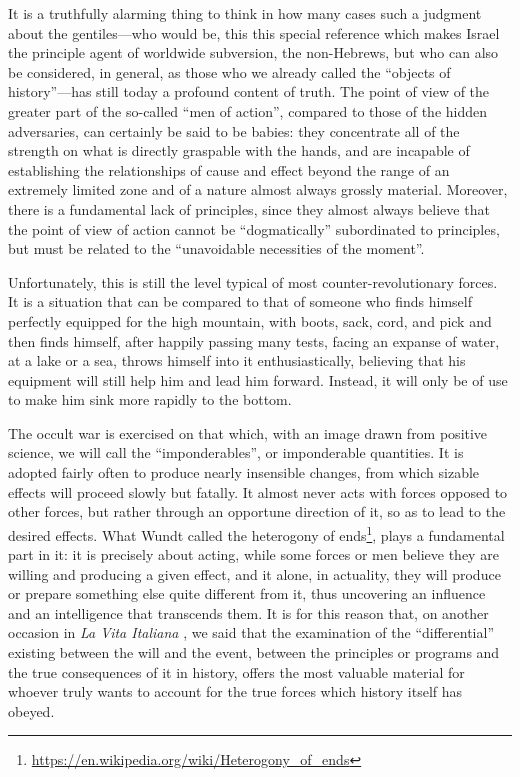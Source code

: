 It is a truthfully alarming thing to think in how many cases such a judgment about the gentiles---who would be, this this special reference which makes Israel the principle agent of worldwide subversion, the non-Hebrews, but who can also be considered, in general, as those who we already called the ``objects of history''---has still today a profound content of truth. The point of view of the greater part of the so-called ``men of action'', compared to those of the hidden adversaries, can certainly be said to be babies: they concentrate all of the strength on what is directly graspable with the hands, and are incapable of establishing the relationships of cause and effect beyond the range of an extremely limited zone and of a nature almost always grossly material. Moreover, there is a fundamental lack of principles, since they almost always believe that the point of view of action cannot be ``dogmatically'' subordinated to principles, but must be related to the ``unavoidable necessities of the moment''.

Unfortunately, this is still the level typical of most counter-revolutionary forces. It is a situation that can be compared to that of someone who finds himself perfectly equipped for the high mountain, with boots, sack, cord, and pick and then finds himself, after happily passing many tests, facing an expanse of water, at a lake or a sea, throws himself into it enthusiastically, believing that his equipment will still help him and lead him forward. Instead, it will only be of use to make him sink more rapidly to the bottom.

The occult war is exercised on that which, with an image drawn from positive science, we will call the ``imponderables'', or imponderable quantities. It is adopted fairly often to produce nearly insensible changes, from which sizable effects will proceed slowly but fatally. It almost never acts with forces opposed to other forces, but rather through an opportune direction of it, so as to lead to the desired effects. What Wundt called the heterogony of ends\footnote{\url{https://en.wikipedia.org/wiki/Heterogony_of_ends}}, plays a fundamental part in it: it is precisely about acting, while some forces or men believe they are willing and producing a given effect, and it alone, in actuality, they will produce or prepare something else quite different from it, thus uncovering an influence and an intelligence that transcends them. It is for this reason that, on another occasion in \emph{La Vita Italiana} , we said that the examination of the ``differential'' existing between the will and the event, between the principles or programs and the true consequences of it in history, offers the most valuable material for whoever truly wants to account for the true forces which history itself has obeyed.

